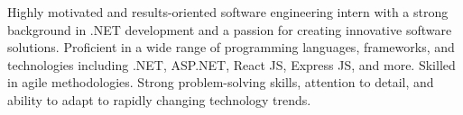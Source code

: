 

\begin{cvparagraph}

Highly motivated and results-oriented software engineering intern with a strong background in .NET development and a passion for creating innovative software solutions. Proficient in a wide range of programming languages, frameworks, and technologies including .NET, ASP.NET, React JS, Express JS, and more. Skilled in agile methodologies. Strong problem-solving skills, attention to detail, and ability to adapt to rapidly changing technology trends.
\end{cvparagraph}
